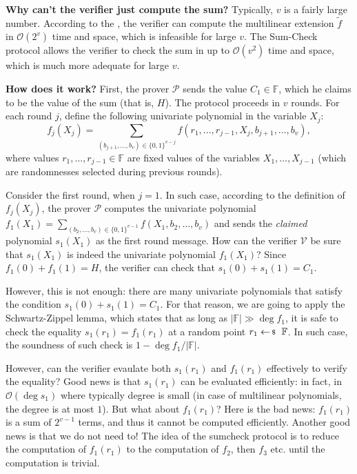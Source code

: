 \textbf{Why can't the verifier just compute the sum?} Typically, $v$ is a fairly
large number. According to the ,
the verifier can compute the multilinear extension $\widetilde{f}$ in
$\mathcal{O}(2^v)$ time and space, which is infeasible for large $v$. The
Sum-Check protocol allows the verifier to check the sum in up to
$\mathcal{O}(v^2)$ time and space, which is much more adequate for large $v$.

\textbf{How does it work?} First, the prover $\mathcal{P}$ sends the value $C_1
\in \mathbb{F}$, which he claims to be the value of the sum (that is, $H$).
The protocol proceeds in $v$ rounds. For each round $j$, define the 
following univariate polynomial in the variable $X_j$:
\begin{equation*}
    f_j(X_j) = \sum_{(b_{j+1},\dots,b_v) \in \{0,1\}^{v-j}} f(r_1,\dots,r_{j-1},X_j,b_{j+1},\dots,b_v),
\end{equation*}
where values $r_1,\dots,r_{j-1} \in \mathbb{F}$ are fixed values of the
variables $X_1,\dots,X_{j-1}$ (which are randomnesses selected during previous
rounds).

Consider the first round, when $j=1$. In such case, according to the definition
of $f_j(X_j)$, the prover $\mathcal{P}$ computes the univariate polynomial
$f_1(X_1) = \sum_{(b_2,\dots,b_v) \in \{0,1\}^{v-1}} f(X_1,b_2,\dots,b_v)$ and 
sends the \textit{claimed} polynomial $s_1(X_1)$ as the first round message.
How can the verifier $\mathcal{V}$ be sure that $s_1(X_1)$ is indeed the
univariate polynomial $f_1(X_1)$? Since $f_1(0) + f_1(1) = H$, the verifier
can check that $s_1(0) + s_1(1) = C_1$. 

However, this is not enough: there are many univariate polynomials that satisfy
the condition $s_1(0) + s_1(1) = C_1$. For that reason, we are going to apply
the Schwartz-Zippel lemma, which states that as long as $|\mathbb{F}| \gg \deg
f_1$, it is safe to check the equality $s_1(r_1) = f_1(r_1)$ at a random point
$r_1 \leftarrowS \mathbb{F}$. In such case, the soundness of such check is
$1-\deg f_1/|\mathbb{F}|$. 

However, can the verifier evaulate both $s_1(r_1)$ and $f_1(r_1)$ effectively to
verify the equality? Good news is that $s_1(r_1)$ can be evaluated efficiently: in
fact, in $\mathcal{O}(\deg s_1)$ where typically degree is small (in case of
multilinear polynomials, the degree is at most $1$). But what about $f_1(r_1)$?
Here is the bad news: $f_1(r_1)$ is a sum of $2^{v-1}$ terms, and thus it cannot
be computed efficiently. Another good news is that we do not need to! The idea
of the sumcheck protocol is to reduce the computation of $f_1(r_1)$ to the
computation of $f_2$, then $f_3$ etc. until the computation is trivial. 

